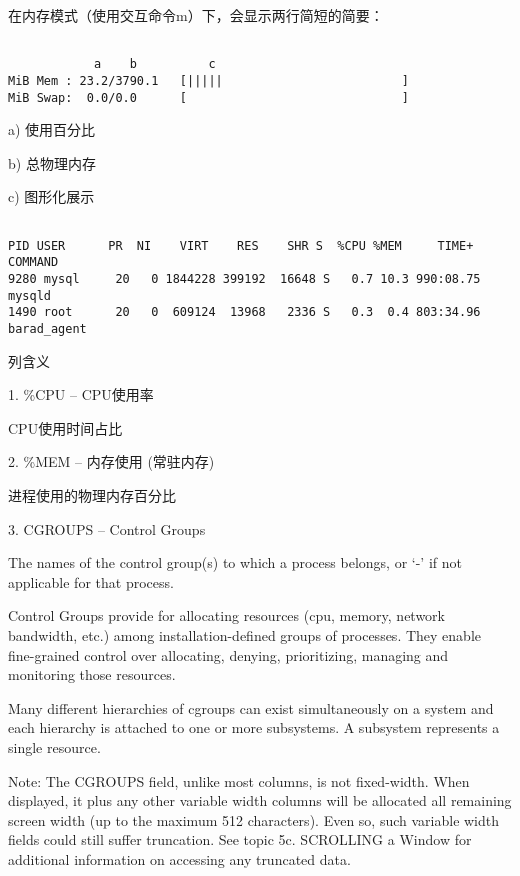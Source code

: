 在内存模式（使用交互命令m）下，会显示两行简短的简要：

\begin{lstlisting}[language=cshell]

            a    b          c
MiB Mem : 23.2/3790.1   [|||||                         ]
MiB Swap:  0.0/0.0      [                              ]

\end{lstlisting}

a) 使用百分比

b) 总物理内存

c) 图形化展示


\begin{lstlisting}[language=cshell]

PID USER      PR  NI    VIRT    RES    SHR S  %CPU %MEM     TIME+ COMMAND
9280 mysql     20   0 1844228 399192  16648 S   0.7 10.3 990:08.75 mysqld
1490 root      20   0  609124  13968   2336 S   0.3  0.4 803:34.96 barad_agent

\end{lstlisting}


列含义



1. \%CPU  -- CPU使用率  \par
\qquad CPU使用时间占比

2. \%MEM  --  内存使用 (常驻内存)   \par
\qquad 进程使用的物理内存百分比

3. CGROUPS  --  Control Groups  \par
The names of the control group(s) to which a process belongs, or `-' if not applicable for that process.

Control Groups provide for allocating resources (cpu, memory, network bandwidth, etc.) among installation-defined groups of processes.  They enable fine-grained control over allocating, denying, prioritizing, managing and monitoring those resources.

Many different hierarchies of cgroups can exist simultaneously on a system and each hierarchy is attached to one or more subsystems.  A subsystem represents a single resource.

Note:  The CGROUPS field, unlike most columns, is not fixed-width.  When displayed, it plus any other variable width columns will be allocated all remaining screen width (up to the maximum 512 characters).  Even so, such variable width fields could still
suffer truncation.  See topic 5c. SCROLLING a Window for additional information on accessing any truncated data.

